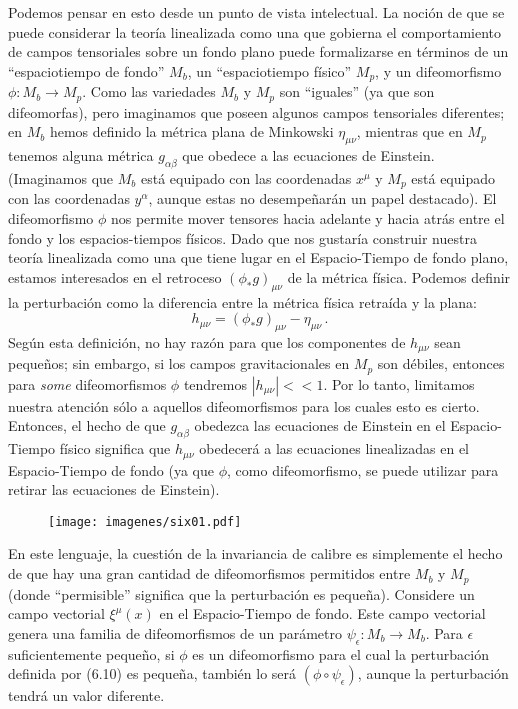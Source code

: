 \documentclass[11pt,b5paper,openany,twoside]{book}
\newcommand{\mn}{{\mu\nu}}
\begin{document}
Podemos pensar en esto desde un punto de vista intelectual.
La noción de que se puede considerar la teoría linealizada como una que gobierna el comportamiento de campos tensoriales sobre un fondo plano puede formalizarse en términos de un ``espaciotiempo de fondo'' $M_b$, un ``espaciotiempo físico'' $M_p$, y un difeomorfismo $\phi:M_b\rightarrow M_p$.
Como las variedades $M_b$ y $M_p$ son ``iguales'' (ya que son difeomorfas), pero imaginamos que poseen algunos campos tensoriales diferentes; en $M_b$ hemos definido la métrica plana de Minkowski $\eta_\mn$, mientras que en $M_p$ tenemos alguna métrica $g_{\alpha\beta}$ que obedece a las ecuaciones de Einstein.
(Imaginamos que $M_b$ está equipado con las coordenadas $x^\mu$ y $M_p$ está equipado con las coordenadas $y^\alpha$, aunque estas no desempeñarán un papel destacado).
El difeomorfismo $\phi$ nos permite mover tensores hacia adelante y hacia atrás entre el fondo y los espacios-tiempos físicos.
Dado que nos gustaría construir nuestra teoría linealizada como una que tiene lugar en el Espacio-Tiempo de fondo plano, estamos interesados en el retroceso $(\phi_*g)_\mn$ de la métrica física.
Podemos definir la perturbación como la diferencia entre la métrica física retraída y la plana:
\begin{equation}
h_\mn = (\phi_*g)_\mn - \eta_\mn\,.\label{6.10}
\end{equation}
Según esta definición, no hay razón para que los componentes de $h_\mn$ sean pequeños; sin embargo, si los campos gravitacionales en $M_p$ son débiles, entonces para {\it some} difeomorfismos $\phi$ tendremos $|h_\mn| << 1$.
Por lo tanto, limitamos nuestra atención sólo a aquellos difeomorfismos para los cuales esto es cierto.
Entonces, el hecho de que $g_{\alpha\beta}$ obedezca las ecuaciones de Einstein en el Espacio-Tiempo físico significa que $h_\mn$ obedecerá a las ecuaciones linealizadas en el Espacio-Tiempo de fondo (ya que $\phi$, como difeomorfismo, se puede utilizar para retirar las ecuaciones de Einstein).

\begin{figure}[h]
\centering
\texttt{[image: imagenes/six01.pdf]}
\end{figure}

En este lenguaje, la cuestión de la invariancia de calibre es simplemente el hecho de que hay una gran cantidad de difeomorfismos permitidos entre $M_b$ y $M_p$ (donde ``permisible'' significa que la perturbación es pequeña).
Considere un campo vectorial $\xi^\mu(x)$ en el Espacio-Tiempo de fondo.
Este campo vectorial genera una familia de difeomorfismos de un parámetro $\psi_\epsilon:M_b\rightarrow M_b$.
Para $\epsilon$ suficientemente pequeño, si $\phi$ es un difeomorfismo para el cual la perturbación definida por (6.10) es pequeña, también lo será $(\phi\circ\psi_\epsilon)$, aunque la perturbación tendrá un valor diferente.
\end{document}
